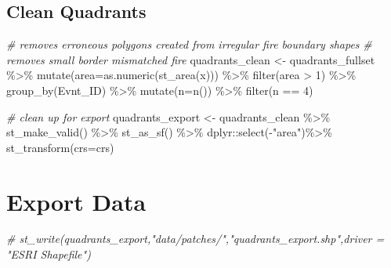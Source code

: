 \documentclass[
]{book}
\newenvironment{Shaded}{\begin{snugshade}}{\end{snugshade}}
\newcommand{\AttributeTok}[1]{\textcolor[rgb]{0.77,0.63,0.00}{#1}}
\newcommand{\CommentTok}[1]{\textcolor[rgb]{0.56,0.35,0.01}{\textit{#1}}}
\newcommand{\DecValTok}[1]{\textcolor[rgb]{0.00,0.00,0.81}{#1}}
\newcommand{\FunctionTok}[1]{\textcolor[rgb]{0.00,0.00,0.00}{#1}}
\newcommand{\NormalTok}[1]{#1}
\newcommand{\OtherTok}[1]{\textcolor[rgb]{0.56,0.35,0.01}{#1}}
\newcommand{\SpecialCharTok}[1]{\textcolor[rgb]{0.00,0.00,0.00}{#1}}
\newcommand{\StringTok}[1]{\textcolor[rgb]{0.31,0.60,0.02}{#1}}
\begin{document}
\hypertarget{clean-quadrants}{%
\section{Clean Quadrants}\label{clean-quadrants}}

\begin{Shaded}
\begin{Highlighting}[]
\CommentTok{\# removes erroneous polygons created from irregular fire boundary shapes}
\CommentTok{\# removes small border mismatched fire}
\NormalTok{quadrants\_clean }\OtherTok{\textless{}{-}}\NormalTok{ quadrants\_fullset }\SpecialCharTok{\%\textgreater{}\%} 
  \FunctionTok{mutate}\NormalTok{(}\AttributeTok{area=}\FunctionTok{as.numeric}\NormalTok{(}\FunctionTok{st\_area}\NormalTok{(x))) }\SpecialCharTok{\%\textgreater{}\%} 
  \FunctionTok{filter}\NormalTok{(area }\SpecialCharTok{\textgreater{}} \DecValTok{1}\NormalTok{) }\SpecialCharTok{\%\textgreater{}\%} 
  \FunctionTok{group\_by}\NormalTok{(Evnt\_ID) }\SpecialCharTok{\%\textgreater{}\%} 
  \FunctionTok{mutate}\NormalTok{(}\AttributeTok{n=}\FunctionTok{n}\NormalTok{()) }\SpecialCharTok{\%\textgreater{}\%} 
  \FunctionTok{filter}\NormalTok{(n }\SpecialCharTok{==} \DecValTok{4}\NormalTok{)}

\CommentTok{\# clean up for export}
\NormalTok{quadrants\_export }\OtherTok{\textless{}{-}}\NormalTok{ quadrants\_clean }\SpecialCharTok{\%\textgreater{}\%} 
  \FunctionTok{st\_make\_valid}\NormalTok{() }\SpecialCharTok{\%\textgreater{}\%} 
  \FunctionTok{st\_as\_sf}\NormalTok{() }\SpecialCharTok{\%\textgreater{}\%} 
\NormalTok{  dplyr}\SpecialCharTok{::}\FunctionTok{select}\NormalTok{(}\SpecialCharTok{{-}}\StringTok{"area"}\NormalTok{)}\SpecialCharTok{\%\textgreater{}\%} 
  \FunctionTok{st\_transform}\NormalTok{(}\AttributeTok{crs=}\NormalTok{crs)}
\end{Highlighting}
\end{Shaded}

\hypertarget{export-data-2}{%
\chapter{Export Data}\label{export-data-2}}

\begin{Shaded}
\begin{Highlighting}[]
\CommentTok{\# st\_write(quadrants\_export,"data/patches/","quadrants\_export.shp",driver = "ESRI Shapefile")}
\end{Highlighting}
\end{Shaded}
\end{document}

